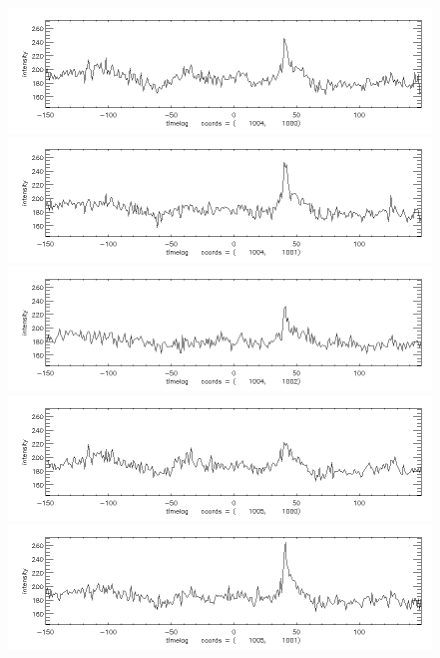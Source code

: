 \documentclass[12pt]{article}
\begin{document}
\begin{figure}[here]
\includegraphics[width=7in]{lc31.png}
\includegraphics[width=7in]{lc32.png}
\includegraphics[width=7in]{lc33.png}
\includegraphics[width=7in]{lc34.png}
\includegraphics[width=7in]{lc35.png}
\end{figure}
\newpage
\end{document}
